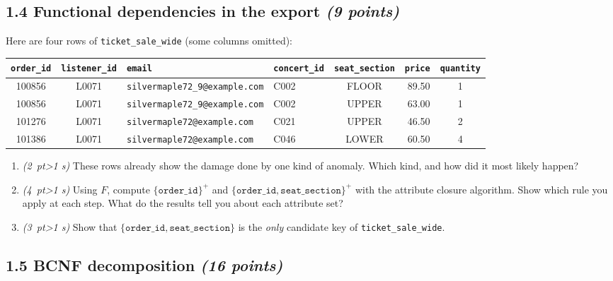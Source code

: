 \documentclass[11pt]{article}
\newcommand{\code}[1]{\texttt{#1}}
\newcommand{\pts}[1]{\hfill\textit{(#1 points)}}
\newcommand{\pt}[1]{\textit{(#1~pt\ifnum#1>1 s\fi)}}
\begin{document}
\subsection*{1.4 Functional dependencies in the export \pts{9}}

Here are four rows of \code{ticket\_sale\_wide} (some columns omitted):

\begin{center}
\footnotesize\setlength{\tabcolsep}{4pt}
\begin{tabular}{@{}ccllcrc@{}}
\toprule
\code{order\_id} & \code{listener\_id} & \code{email} & \code{concert\_id} & \code{seat\_section} & \code{price} & \code{quantity}\\
\midrule
100856 & L0071 & \code{silvermaple72\_9@example.com} & C002 & FLOOR & 89.50 & 1\\
100856 & L0071 & \code{silvermaple72\_9@example.com} & C002 & UPPER & 63.00 & 1\\
101276 & L0071 & \code{silvermaple72@example.com}    & C021 & UPPER & 46.50 & 2\\
101386 & L0071 & \code{silvermaple72@example.com}    & C046 & LOWER & 60.50 & 4\\
\bottomrule
\end{tabular}
\end{center}

\begin{enumerate}[label=(\alph*)]
  \item \pt{2} These rows already show the damage done by one kind of
  anomaly. Which kind, and how did it most likely happen? 

  \item \pt{4} Using $F$, compute $\{\code{order\_id}\}^+$ and
  $\{\code{order\_id}, \code{seat\_section}\}^+$ with the attribute closure
  algorithm. Show which rule you apply at each step. What do the results tell
  you about each attribute set?

  \item \pt{3} Show that $\{\code{order\_id}, \code{seat\_section}\}$ is the
  \emph{only} candidate key of \code{ticket\_sale\_wide}.
\end{enumerate}

\subsection*{1.5 BCNF decomposition \pts{16}}
\end{document}
